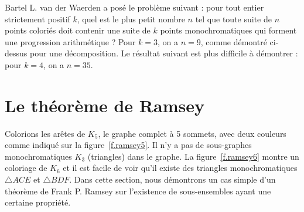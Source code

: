 Bartel L. van der Waerden a posé le problème suivant : pour tout entier strictement positif $k$, quel est le plus petit nombre $n$ tel que toute suite de $n$ points coloriés doit contenir une suite de $k$ points monochromatiques qui forment une progression arithmétique ? Pour $k=3$, on a $n=9$, comme démontré ci-dessus pour une décomposition. Le résultat suivant est plus difficile à démontrer : pour $k=4$, on a $n=35$.




\section{Le théorème de Ramsey}\label{s.ramsey}

Colorions les arêtes de $K_5$, le graphe complet à 5 sommets, avec deux couleurs comme indiqué sur la figure~\ref{f.ramsey5}. Il n'y a pas de sous-graphes monochromatiques $K_3$ (triangles) dans le graphe. La figure~\ref{f.ramsey6} montre un coloriage de $K_6$ et il est facile de voir qu'il existe des triangles monochromatiques $\triangle ACE$ et $\triangle BDF$. Dans cette section, nous démontrons un cas simple d'un théorème de Frank P. Ramsey sur l'existence de sous-ensembles ayant une certaine propriété.


\vspace{0.4cm}

